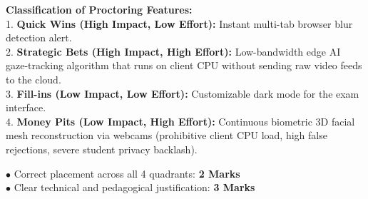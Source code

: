 \begin{solutionbox}
\textbf{Classification of Proctoring Features:}\\
1. \textbf{Quick Wins (High Impact, Low Effort):} Instant multi-tab browser blur detection alert.\\
2. \textbf{Strategic Bets (High Impact, High Effort):} Low-bandwidth edge AI gaze-tracking algorithm that runs on client CPU without sending raw video feeds to the cloud.\\
3. \textbf{Fill-ins (Low Impact, Low Effort):} Customizable dark mode for the exam interface.\\
4. \textbf{Money Pits (Low Impact, High Effort):} Continuous biometric 3D facial mesh reconstruction via webcams (prohibitive client CPU load, high false rejections, severe student privacy backlash).
\begin{markingrubric}
$\bullet$ Correct placement across all 4 quadrants: \textbf{2 Marks}\\
$\bullet$ Clear technical and pedagogical justification: \textbf{3 Marks}
\end{markingrubric}
\end{solutionbox}

